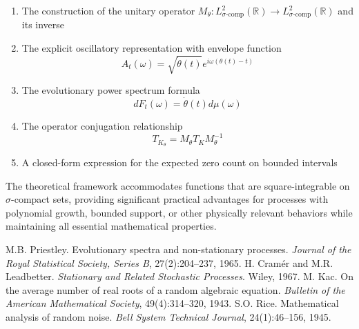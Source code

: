 \documentclass{article}
\begin{document}
\begin{enumerate}
\item The construction of the unitary operator $M_{\theta}: L^2_{\sigma\text{-comp}}(\mathbb{R}) \to L^2_{\sigma\text{-comp}}(\mathbb{R})$ and its inverse
\item The explicit oscillatory representation with envelope function
\begin{equation}
A_t(\omega) = \sqrt{\dot{\theta}(t)} e^{i\omega(\theta(t) - t)}
\end{equation}
\item The evolutionary power spectrum formula
\begin{equation}
dF_t(\omega) = \dot{\theta}(t) d\mu(\omega)
\end{equation}
\item The operator conjugation relationship
\begin{equation}
T_{K_{\theta}} = M_{\theta} T_K M_{\theta}^{-1}
\end{equation}
\item A closed-form expression for the expected zero count on bounded intervals
\end{enumerate}

The theoretical framework accommodates functions that are square-integrable on $\sigma$-compact sets, providing significant practical advantages for processes with polynomial growth, bounded support, or other physically relevant behaviors while maintaining all essential mathematical properties.

\begin{thebibliography}{99}
 M.B. Priestley. Evolutionary spectra and non-stationary processes. \emph{Journal of the Royal Statistical Society, Series B}, 27(2):204--237, 1965.
 H. Cramér and M.R. Leadbetter. \emph{Stationary and Related Stochastic Processes}. Wiley, 1967.
 M. Kac. On the average number of real roots of a random algebraic equation. \emph{Bulletin of the American Mathematical Society}, 49(4):314--320, 1943.
 S.O. Rice. Mathematical analysis of random noise. \emph{Bell System Technical Journal}, 24(1):46--156, 1945.
\end{thebibliography}
\end{document}
